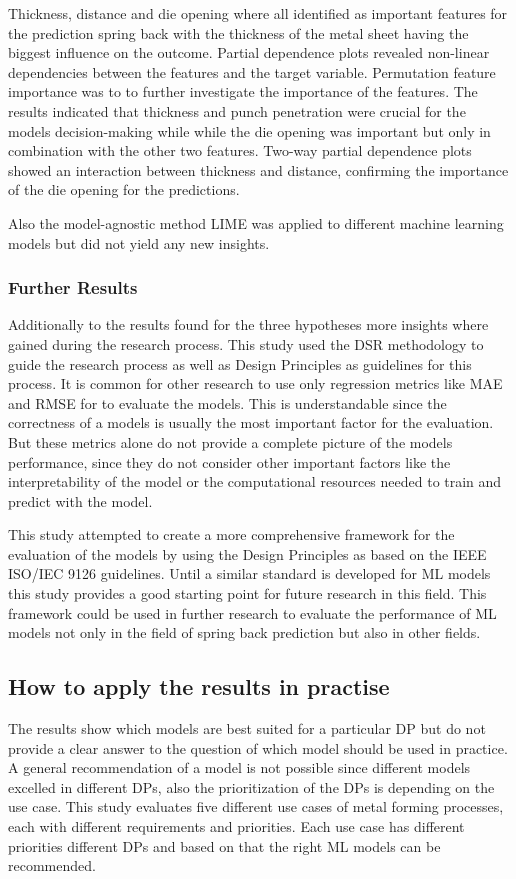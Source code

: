 Thickness, distance and die opening where all identified as important features for the prediction spring back with the
thickness of the metal sheet having the biggest influence on the outcome.
Partial dependence plots revealed non-linear dependencies between the features and the target variable.
Permutation feature importance was to to further investigate the importance of the features.
The results indicated that thickness and punch penetration were crucial for the models decision-making while while the
die opening was important but only in combination with the other two features.
Two-way partial dependence plots showed an interaction between thickness and distance, confirming the importance of the
die opening for the predictions.

Also the model-agnostic method LIME was applied to different machine learning models but did not yield any new insights.

\subsubsection*{Further Results}
Additionally to the results found for the three hypotheses more insights where gained during the research process.
This study used the \ac{DSR} methodology to guide the research process as well as Design Principles as guidelines for
this process.
It is common for other research to use only regression metrics like MAE and RMSE for to evaluate the models.
This is understandable since the correctness of a models is usually the most important factor for the evaluation.
But these metrics alone do not provide a complete picture of the models performance, since they do not consider
other important factors like the interpretability of the model or the computational resources needed to train and
predict with the model.

This study attempted to create a more comprehensive framework for the evaluation of the models by using the Design
Principles as based on the IEEE ISO/IEC 9126 guidelines.
Until a similar standard is developed for \ac{ML} models this study provides a good starting point for future research
in this field.
This framework could be used in further research to evaluate the performance of \ac{ML} models not only in the field of
spring back prediction but also in other fields.

\subsection{How to apply the results in practise}\label{subsec:how-to-apply-the-results-in-practise}
The results show which models are best suited for a particular \ac{DP} but do not provide a clear answer to the
question of which model should be used in practice.
A general recommendation of a model is not possible since different models excelled in different \ac{DP}s, also the
prioritization of the \ac{DP}s is depending on the use case.
This study evaluates five different use cases of metal forming processes, each with different requirements and
priorities.
Each use case has different priorities different \ac{DP}s and based on that the right \ac{ML} models
can be recommended.


